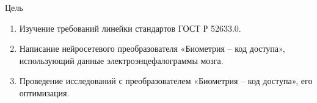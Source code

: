 \begin{frame}{Цель}
	\begin{enumerate}
		\item Изучение требований линейки стандартов ГОСТ Р 52633.0.
		\item Написание нейросетевого преобразователя «Биометрия – код доступа»,
			использующий данные электроэнцефалограммы мозга.
		\item Проведение исследований с преобразователем «Биометрия – код доступа», его оптимизация.
	\end{enumerate}
\end{frame}
